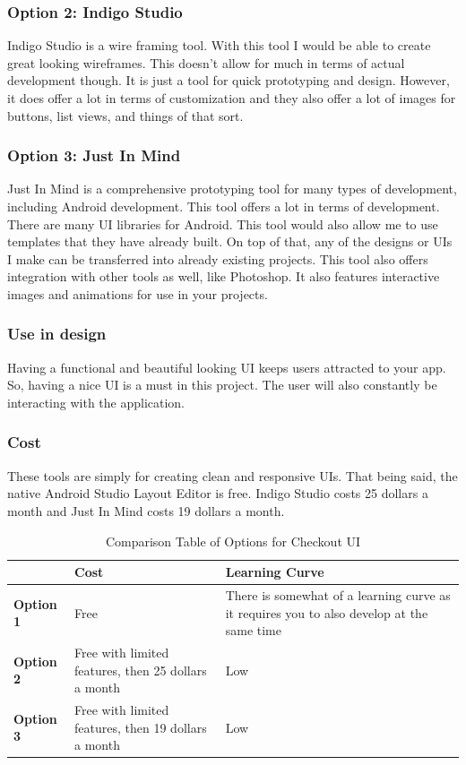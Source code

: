 \documentclass[journal,compsoc, 10pt, draftclsnofoot, onecolumn]{IEEEtran}
\begin{document}
\subsubsection*{Option 2: Indigo Studio}
Indigo Studio is a wire framing tool. With this tool I would be able to create
great looking wireframes. This doesn't allow for much in terms of actual
development though. It is just a tool for quick prototyping and design. However, 
it does offer a lot in terms of customization and they also offer a lot of
images for buttons, list views, and things of that sort.

\subsubsection*{Option 3: Just In Mind}
Just In Mind is a comprehensive prototyping tool for many types of development,
including Android development. This tool offers a lot in terms of development.
There are many UI libraries for Android. This tool would also allow me to use
templates that they have already built. On top of that, any of the designs or
UIs I make can be transferred into already existing projects. This tool also
offers integration with other tools as well, like Photoshop. It also features
interactive images and animations for use in your projects.

\subsubsection*{Use in design}
Having a functional and beautiful looking UI keeps users attracted to your app.
So, having a nice UI is a must in this project. The user will also constantly be
interacting with the application.

\subsubsection*{Cost}
These tools are simply for creating clean and responsive UIs. That being said,
the native Android Studio Layout Editor is free. Indigo Studio costs 25 dollars
a month and Just In Mind costs 19 dollars a month.

\begin{table}[h]
\centering
\caption{Comparison Table of Options for Checkout UI}
\label{Comparison table for checkout}
\begin{tabularx}{\textwidth}{|l|l|X|}
\hline
\textbf{}         & \textbf{Cost}                & \textbf{Learning Curve} \\ \hline
\textbf{Option 1} & Free                                                & There
is somewhat of a learning curve as it requires you to also develop at the same time \\ \hline
\textbf{Option 2} & Free with limited features, then 25 dollars a month & Low \\ \hline
\textbf{Option 3} & Free with limited features, then 19 dollars a month & Low \\ \hline
\end{tabularx}
\end{table}
\end{document}
